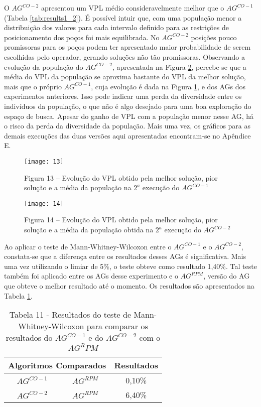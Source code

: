 O $AG^{CO-2}$ apresentou um VPL médio consideravelmente melhor que o $AG^{CO-1}$ (Tabela \ref{tab:results1_2}). É possível intuir que, com uma população menor a distribuição dos valores para cada intervalo definido para as restrições de posicionamento dos poços foi mais equilibrada. No $AG^{CO-2}$ posições pouco promissoras para os poços podem ter apresentado maior probabilidade de serem escolhidas pelo operador, gerando soluções não tão promissoras. Observando a evolução da população do $AG^{CO-2}$, apresentada na Figura \ref{fig:graph5_2}, percebe-se que a média do VPL da população se aproxima bastante do VPL da melhor solução, mais que o próprio $AG^{CO-1}$, cuja evolução é dada na Figura \ref{fig:graph5_1}, e dos AGs dos experimentos anteriores. Isso pode indicar uma perda da diversidade entre os indivíduos da população, o que não é algo desejado para uma boa exploração do espaço de busca. Apesar do ganho de VPL com a população menor nesse AG, há o risco da perda da diversidade da população. Mais uma vez, os gráficos para as demais execuções das duas versões aqui apresentadas encontram-se no Apêndice E.

\begin{figure}[H]
\centering
\texttt{[image: 13]}
\caption{Figura 13  – Evolução do VPL obtido pela melhor solução, pior solução e a média da população na $2^a$ execução do $AG^{CO-1}$}
\label{fig:graph5_1}
\end{figure}

\begin{figure}[H]
\centering
\texttt{[image: 14]}
\caption{Figura 14  – Evolução do VPL obtido pela melhor solução, pior solução e a média da população obtida na $2^a$ execução do $AG^{CO-2}$}
\label{fig:graph5_2}
\end{figure}

Ao aplicar o teste de Mann-Whitney-Wilcoxon entre o $AG^{CO-1}$ e o $AG^{CO-2}$, constata-se que a diferença entre os resultados desses AGs é significativa. Mais uma vez utilizando o limiar de 5\%, o teste obteve como resultado 1,40\%.  Tal teste também foi aplicado entre os AGs desse experimento e o $AG^{RPM}$, versão do AG que obteve o melhor resultado até o momento. Os resultados são apresentados na Tabela \ref{tab:mw5_1}.

\begin{table}[H]
\centering
\caption{Tabela 11 - Resultados do teste de Mann-Whitney-Wilcoxon para comparar os resultados do $AG^{CO-1}$ e do $AG^{CO-2}$ com o $AG^RPM$}
\label{tab:mw5_1}
\begin{tabular}{|c|c|c|}
\hline
\multicolumn{2}{|c|}{Algoritmos Comparados} & Resultados \\ \hline
$AG^{CO-1}$ & $AG^{RPM}$ & 0,10\% \\ \hline
$AG^{CO-2}$ & $AG^{RPM}$ & 6,40\% \\ \hline

\end{tabular}
\end{table}

